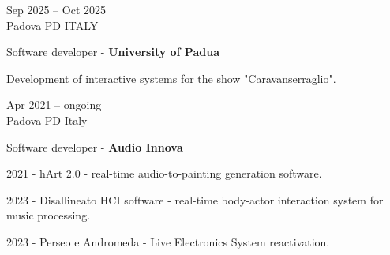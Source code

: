 \documentclass[7pt,a4paper]{article}
\begin{document}
\begin{mdframed}[
    backgroundcolor=white,
    linecolor=white,
    linewidth=0pt,
    innerleftmargin=6pt,
    innerrightmargin=6pt,
    innertopmargin=6pt,
    innerbottommargin=6pt,
    skipabove=0pt,
    skipbelow=0pt
]

\begin{minipage}[t]{0.28\textwidth}

Sep 2025 – Oct 2025
\\\scriptsize Padova PD ITALY

\end{minipage}
\begin{minipage}[t]{0.68\textwidth}
Software developer - \textbf{University of Padua}

\par \scriptsize Development of interactive systems for the show "Caravanserraglio".

\vspace{0.25cm}
\end{minipage}
\end{mdframed}


\begin{mdframed}[
    backgroundcolor=entrygray,
    linecolor=entrygray,
    linewidth=0pt,
    innerleftmargin=6pt,
    innerrightmargin=6pt,
    innertopmargin=6pt,
    innerbottommargin=6pt,
    skipabove=0pt,
    skipbelow=0pt
]

\begin{minipage}[t]{0.28\textwidth}

Apr 2021 – ongoing
\\\scriptsize Padova PD Italy

\end{minipage}
\begin{minipage}[t]{0.68\textwidth}
Software developer - \textbf{Audio Innova}

\par \scriptsize 2021 - hArt 2.0 - real-time audio-to-painting generation software.

\par \scriptsize 2023 - Disallineato HCI software - real-time body-actor interaction system for music processing.

\par \scriptsize 2023 - Perseo e Andromeda - Live Electronics System reactivation.

\vspace{0.25cm}
\end{minipage}
\end{mdframed}
\end{document}
